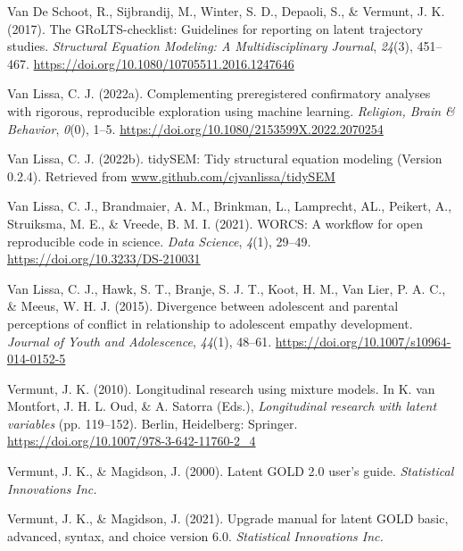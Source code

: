 \documentclass[
  ,man,floatsintext]{apa6}
\newlength{\cslhangindent}
\newlength{\cslentryspacingunit} %
\newenvironment{CSLReferences}[2] %
 {%
  \setlength{\parindent}{0pt}
  \ifodd #1
  \let\oldpar\par
  \def\par{\hangindent=\cslhangindent\oldpar}
  \fi
  \setlength{\parskip}{#2\cslentryspacingunit}
 }%
 {}
\begin{document}
\begin{CSLReferences}{1}{0}
\leavevmode{}%
Van De Schoot, R., Sijbrandij, M., Winter, S. D., Depaoli, S., \& Vermunt, J. K. (2017). The {GRoLTS}-checklist: Guidelines for reporting on latent trajectory studies. \emph{Structural Equation Modeling: A Multidisciplinary Journal}, \emph{24}(3), 451--467. \url{https://doi.org/10.1080/10705511.2016.1247646}

\leavevmode{}%
Van Lissa, C. J. (2022a). Complementing preregistered confirmatory analyses with rigorous, reproducible exploration using machine learning. \emph{Religion, Brain \& Behavior}, \emph{0}(0), 1--5. \url{https://doi.org/10.1080/2153599X.2022.2070254}

\leavevmode{}%
Van Lissa, C. J. (2022b). {tidySEM}: Tidy structural equation modeling (Version 0.2.4). Retrieved from \href{https://www.github.com/cjvanlissa/tidySEM}{www.github.com/cjvanlissa/tidySEM}

\leavevmode{}%
Van Lissa, C. J., Brandmaier, A. M., Brinkman, L., Lamprecht, AL., Peikert, A., Struiksma, M. E., \& Vreede, B. M. I. (2021). {WORCS}: A workflow for open reproducible code in science. \emph{Data Science}, \emph{4}(1), 29--49. \url{https://doi.org/10.3233/DS-210031}

\leavevmode{}%
Van Lissa, C. J., Hawk, S. T., Branje, S. J. T., Koot, H. M., Van Lier, P. A. C., \& Meeus, W. H. J. (2015). Divergence between adolescent and parental perceptions of conflict in relationship to adolescent empathy development. \emph{Journal of Youth and Adolescence}, \emph{44}(1), 48--61. \url{https://doi.org/10.1007/s10964-014-0152-5}

\leavevmode{}%
Vermunt, J. K. (2010). Longitudinal research using mixture models. In K. van Montfort, J. H. L. Oud, \& A. Satorra (Eds.), \emph{Longitudinal research with latent variables} (pp. 119--152). Berlin, Heidelberg: Springer. \url{https://doi.org/10.1007/978-3-642-11760-2_4}

\leavevmode{}%
Vermunt, J. K., \& Magidson, J. (2000). Latent {GOLD} 2.0 user's guide. \emph{Statistical Innovations Inc.}

\leavevmode{}%
Vermunt, J. K., \& Magidson, J. (2021). Upgrade manual for latent {GOLD} basic, advanced, syntax, and choice version 6.0. \emph{Statistical Innovations Inc.}


\end{CSLReferences}
\end{document}
